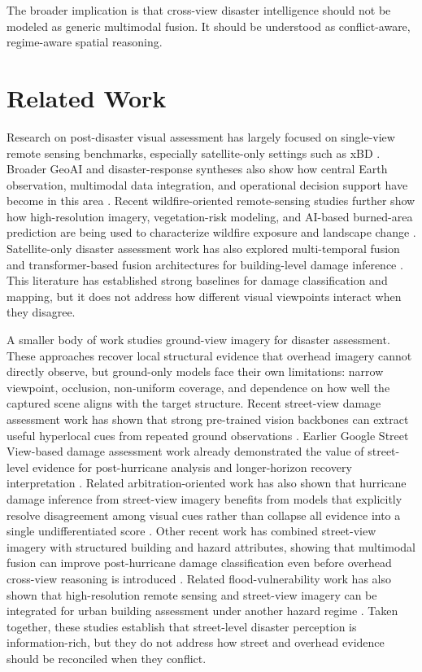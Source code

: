 \documentclass[sigconf]{acmart}
\begin{document}
The broader implication is that cross-view disaster intelligence should not be
modeled as generic multimodal fusion. It should be understood as conflict-aware,
regime-aware spatial reasoning.

\section{Related Work}

Research on post-disaster visual assessment has largely focused on single-view
remote sensing benchmarks, especially satellite-only settings such as xBD
\cite{gupta2019creating}. Broader GeoAI and disaster-response syntheses also show
how central Earth observation, multimodal data integration, and operational
decision support have become in this area \cite{zou2023geoai,raj2025ai,li2025earthobs}. Recent wildfire-oriented remote-sensing studies further show how high-resolution imagery, vegetation-risk modeling, and AI-based burned-area prediction are being used to characterize wildfire exposure and landscape change
\cite{tang2025evaluating,pang2025fire,nagaraja2025vegetation}. Satellite-only disaster assessment work has also explored multi-temporal fusion and transformer-based fusion architectures for building-level damage inference
\cite{weber2020building,xiao2023cross}. This literature has established strong baselines for
damage classification and mapping, but it does not address how different visual
viewpoints interact when they disagree.

A smaller body of work studies ground-view imagery for disaster assessment.
These approaches recover local structural evidence that overhead imagery cannot
directly observe, but ground-only models face their own limitations: narrow
viewpoint, occlusion, non-uniform coverage, and dependence on how well the
captured scene aligns with the target structure. Recent street-view damage
assessment work has shown that strong pre-trained vision backbones can extract
useful hyperlocal cues from repeated ground observations
\cite{yang2025hyperlocal}. Earlier Google Street View-based damage assessment
work already demonstrated the value of street-level evidence for post-hurricane
analysis and longer-horizon recovery interpretation
\cite{zhai2020damage,mabon2016charting}. Related arbitration-oriented work has also shown
that hurricane damage inference from street-view imagery benefits from models
that explicitly resolve disagreement among visual cues rather than collapse all
evidence into a single undifferentiated score \cite{yang2026damagearbiter}.
Other recent work has combined street-view imagery with structured building and
hazard attributes, showing that multimodal fusion can improve post-hurricane
damage classification even before overhead cross-view reasoning is introduced
\cite{xue2024post}. Related flood-vulnerability work has also shown that
high-resolution remote sensing and street-view imagery can be integrated for
urban building assessment under another hazard regime \cite{xing2023flood}.
Taken together, these studies establish that street-level
disaster perception is information-rich, but they do not address how street and
overhead evidence should be reconciled when they conflict.
\end{document}
